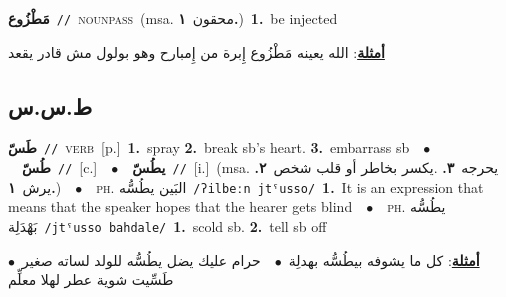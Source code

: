 \documentclass[10pt,a4paper,twoside]{article} %
\begin{document}
\begin{multicols}{2}
{\setlength\topsep{0pt}\textbf{\foreignlanguage{arabic}{مَطْزُوع}}\ {\color{gray}\texttt{//}\color{black}}\ \textsc{noun\textunderscore pass}\ \color{gray}(msa. \foreignlanguage{arabic}{محقون}~\foreignlanguage{arabic}{\textbf{١.}})\color{black}\ \textbf{1.}~be injected\  \begin{flushright}\color{gray}\foreignlanguage{arabic}{\textbf{\underline{\foreignlanguage{arabic}{أمثلة}}}: الله يعينه مَطْزُوع إِبرة من إِمبارح وهو بولول مش قادر يقعد}\end{flushright}\color{black}} \vspace{2mm}

\vspace{-3mm}
\subsection*{\color{blue}\foreignlanguage{arabic}{ط.س.س}\color{blue}{}} 

{\setlength\topsep{0pt}\textbf{\foreignlanguage{arabic}{طَسّ}}\ {\color{gray}\texttt{//}\color{black}}\ \textsc{verb}\ [p.]\ \textbf{1.}~spray  \textbf{2.}~break sb's heart.  \textbf{3.}~embarrass sb\ \ $\bullet$\ \ \setlength\topsep{0pt}\textbf{\foreignlanguage{arabic}{طُسّ}}\ {\color{gray}\texttt{//}\color{black}}\ [c.]\ \ $\bullet$\ \ \setlength\topsep{0pt}\textbf{\foreignlanguage{arabic}{يطُسّ}}\ {\color{gray}\texttt{//}\color{black}}\ [i.]\ \color{gray}(msa. \foreignlanguage{arabic}{يحرجه}~\foreignlanguage{arabic}{\textbf{٣.}}  .\foreignlanguage{arabic}{يكسر بخاطر أو قلب شخص}~\foreignlanguage{arabic}{\textbf{٢.}}  \foreignlanguage{arabic}{يرش}~\foreignlanguage{arabic}{\textbf{١.}})\color{black}\ \ $\bullet$\ \ \textsc{ph.} \color{gray} \foreignlanguage{arabic}{البَين يطُسُّه}\color{black}\ {\color{gray}\texttt{/{\sffamily ʔilbeːn jtˤusso}/}\color{black}}\ \textbf{1.}~It is an expression that means that the speaker hopes that the hearer gets blind\ \ $\bullet$\ \ \textsc{ph.} \color{gray} \foreignlanguage{arabic}{يطُسُّه بَهْدَلِة}\color{black}\ {\color{gray}\texttt{/{\sffamily jtˤusso bahdale}/}\color{black}}\ \textbf{1.}~scold sb.  \textbf{2.}~tell sb off\  \begin{flushright}\color{gray}\foreignlanguage{arabic}{\textbf{\underline{\foreignlanguage{arabic}{أمثلة}}}: كل ما يشوفه بيطُسُّه بهدلِة\ $\bullet$\ \  حرام عليك يضل يطُسُّه للولد لساته صغير\ $\bullet$\ \  طَسِّيت شوية عطر لهلا معلِّم}\end{flushright}\color{black}} \vspace{2mm}


\end{multicols}
\end{document}
